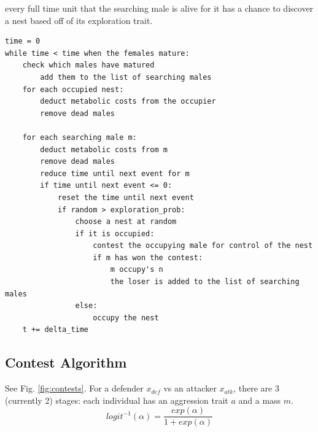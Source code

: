 \documentclass[a4paper,11pt]{article}
\begin{document}
every full time unit that the searching male is alive for it has a chance to discover a nest based off of its exploration trait.

\begin{verbatim}
time = 0
while time < time when the females mature:
    check which males have matured
        add them to the list of searching males
    for each occupied nest:
        deduct metabolic costs from the occupier
        remove dead males

    for each searching male m:
        deduct metabolic costs from m
        remove dead males
        reduce time until next event for m
        if time until next event <= 0:
            reset the time until next event
            if random > exploration_prob:
                choose a nest at random
                if it is occupied:
                    contest the occupying male for control of the nest
                    if m has won the contest:
                        m occupy's n
                        the loser is added to the list of searching males
                else:
                    occupy the nest
    t += delta_time
\end{verbatim}

\subsection{Contest Algorithm}
See Fig. \ref{fig:contests}.
For a defender $x_{def}$ vs an attacker $x_{atk}$, there are 3 (currently 2) stages:
each individual has an aggression trait $a$ and a mass $m$.
\begin{equation}\label{eq:logit}
    logit^{-1}(\alpha) = \frac{exp(\alpha)}{1 + exp(\alpha)}
\end{equation}
\end{document}

